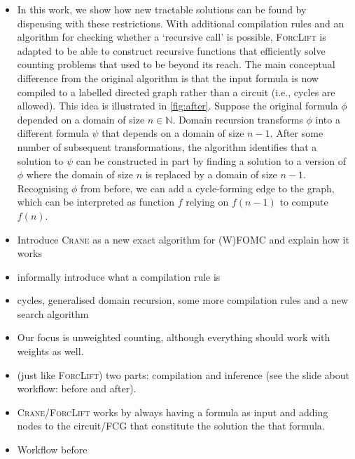 
\begin{itemize}
  \item In this work, we show how new tractable solutions can be found by
        dispensing with these restrictions. With additional compilation rules
        and an algorithm for checking whether a `recursive call' is possible,
        \textsc{ForcLift} \citep{DBLP:conf/ijcai/BroeckTMDR11} is adapted to be
        able to construct recursive functions that efficiently solve counting
        problems that used to be beyond its reach. The main conceptual
        difference from the original algorithm is that the input formula is now
        compiled to a labelled directed graph rather than a circuit (i.e.,
        cycles are allowed). This idea is illustrated in \cref{fig:after}.
        Suppose the original formula $\phi$ depended on a domain of size
        $n \in \mathbb{N}$. Domain recursion transforms $\phi$ into a different
        formula $\psi$ that depends on a domain of size $n-1$. After some number
        of subsequent transformations, the algorithm identifies that a solution
        to $\psi$ can be constructed in part by finding a solution to a version
        of $\phi$ where the domain of size $n$ is replaced by a domain of size
        $n-1$. Recognising $\phi$ from before, we can add a cycle-forming edge
        to the graph, which can be interpreted as function $f$ relying on
        $f(n-1)$ to compute $f(n)$.
  \item Introduce \textsc{Crane} as a new exact algorithm for (W)FOMC and
        explain how it works
  \item informally introduce what a compilation rule is
  \item cycles, generalised domain recursion, some more compilation rules and a
        new search algorithm
  \item Our focus is unweighted counting, although everything should work with
        weights as well.
  \item (just like \textsc{ForcLift}) two parts: compilation and inference (see
        the slide about workflow: before and after).
  \item \textsc{Crane/ForcLift} works by always having a formula as input and
        adding nodes to the circuit/FCG that constitute the solution the that
        formula.
  \item Workflow before
  \begin{itemize}

\end{itemize}
\end{itemize}
